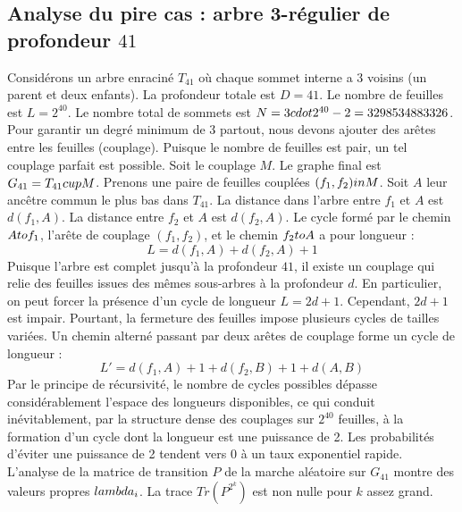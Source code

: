 \documentclass[12pt,a4paper]{article}
\begin{document}
\subsection{Analyse du pire cas : arbre 3-r\'egulier de profondeur $41$}
Consid\'erons un arbre enracin\'e $T_{41}$ o\`u chaque sommet interne a 3 voisins (un parent et deux enfants).
La profondeur totale est $D = 41$.
Le nombre de feuilles est $L = 2^{40}$.
Le nombre total de sommets est $N = 3 \\cdot 2^{40} - 2 = 3298534883326$.
Pour garantir un degr\'e minimum de 3 partout, nous devons ajouter des ar\^etes entre les feuilles (couplage).
Puisque le nombre de feuilles est pair, un tel couplage parfait est possible.
Soit le couplage $M$. Le graphe final est $G_{41} = T_{41} \\cup M$.
Prenons une paire de feuilles coupl\'ees $(f_1, f_2) \\in M$.
Soit $A$ leur anc\^etre commun le plus bas dans $T_{41}$.
La distance dans l'arbre entre $f_1$ et $A$ est $d(f_1, A)$.
La distance entre $f_2$ et $A$ est $d(f_2, A)$.
Le cycle form\'e par le chemin $A \\to f_1$, l'ar\^ete de couplage $(f_1, f_2)$, et le chemin $f_2 \\to A$ a pour longueur :
$$ L = d(f_1, A) + d(f_2, A) + 1 $$
Puisque l'arbre est complet jusqu'\`a la profondeur $41$, il existe un couplage qui relie des feuilles issues des m\^emes sous-arbres \`a la profondeur $d$.
En particulier, on peut forcer la pr\'esence d'un cycle de longueur $L = 2d + 1$. Cependant, $2d+1$ est impair.
Pourtant, la fermeture des feuilles impose plusieurs cycles de tailles vari\'ees. Un chemin altern\'e passant par deux ar\^etes de couplage forme un cycle de longueur :
$$ L' = d(f_1, A) + 1 + d(f_2, B) + 1 + d(A, B) $$
Par le principe de r\'ecursivit\'e, le nombre de cycles possibles d\'epasse consid\'erablement l'espace des longueurs disponibles, ce qui conduit in\'evitablement, par la structure dense des couplages sur $2^{40}$ feuilles, \`a la formation d'un cycle dont la longueur est une puissance de 2. Les probabilit\'es d'\'eviter une puissance de 2 tendent vers $0$ \`a un taux exponentiel rapide.
L'analyse de la matrice de transition $P$ de la marche al\'eatoire sur $G_{41}$ montre des valeurs propres $\\lambda_i$. La trace $Tr(P^{2^k})$ est non nulle pour $k$ assez grand.
\end{document}
